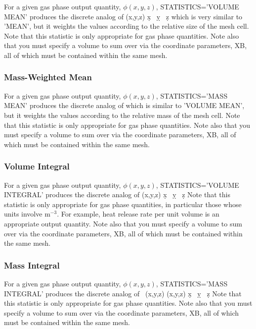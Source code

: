 \documentclass[11pt]{book}
\begin{document}
For a given gas phase output quantity, $\phi(x,y,z)$, {\ct STATISTICS='VOLUME MEAN'} produces the discrete analog of
\be {} \; \int \phi(x,y,z) \; \d x \, \d y \, \d z \ee
which is very similar to {\ct 'MEAN'}, but it weights the values according to the relative size of the mesh cell. Note that this
statistic is only appropriate for gas phase quantities. Note also that you must specify a volume to sum over via the
coordinate parameters, {\ct XB}, all of which must be contained within the same mesh.

\subsubsection{Mass-Weighted Mean}

For a given gas phase output quantity, $\phi(x,y,z)$, {\ct STATISTICS='MASS MEAN'} produces the discrete analog of
\be {}  \ee
which is similar to {\ct 'VOLUME MEAN'}, but it weights the values according to the relative mass of the mesh cell. Note that this
statistic is only appropriate for gas phase quantities. Note also that you must specify a volume to sum over via the
coordinate parameters, {\ct XB}, all of which must be contained within the same mesh.

\subsubsection{Volume Integral}

For a given gas phase output quantity, $\phi(x,y,z)$, {\ct STATISTICS='VOLUME INTEGRAL'} produces the discrete analog of
\be \int \phi(x,y,z) \; \d x \, \d y \, \d z \ee
Note that this statistic is only appropriate for gas phase quantities, in particular those whose units involve m$^{-3}$. For example,
heat release rate per unit volume is an appropriate output quantity. Note also that you must specify a volume to sum over via the
coordinate parameters, {\ct XB}, all of which must be contained within the same mesh.

\subsubsection{Mass Integral}

For a given gas phase output quantity, $\phi(x,y,z)$, {\ct STATISTICS='MASS INTEGRAL'} produces the discrete analog of
\be \int \, \rho(x,y,z) \; \phi(x,y,z) \; \d x \, \d y \, \d z \ee
Note that this statistic is only appropriate for gas phase quantities. Note also that you must specify a volume to sum over via the
coordinate parameters, {\ct XB}, all of which must be contained within the same mesh.
\end{document}
